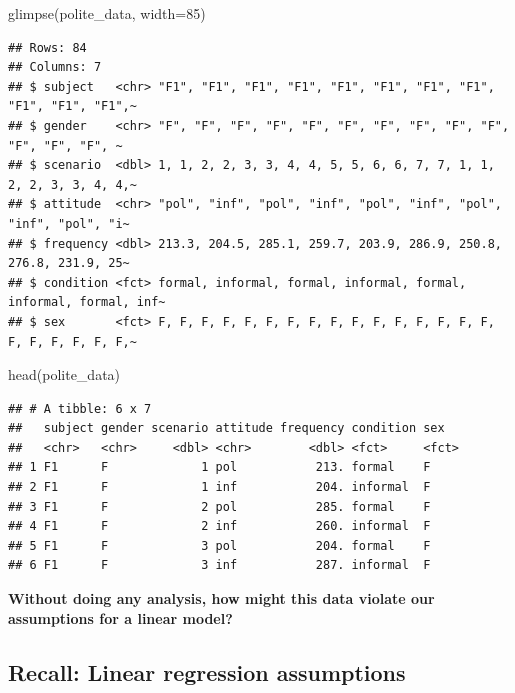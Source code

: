 \documentclass[
  openany]{book}
\newenvironment{Shaded}{\begin{snugshade}}{\end{snugshade}}
\newcommand{\AttributeTok}[1]{\textcolor[rgb]{0.77,0.63,0.00}{#1}}
\newcommand{\DecValTok}[1]{\textcolor[rgb]{0.00,0.00,0.81}{#1}}
\newcommand{\FunctionTok}[1]{\textcolor[rgb]{0.00,0.00,0.00}{#1}}
\newcommand{\NormalTok}[1]{#1}
\begin{document}
\begin{Shaded}
\begin{Highlighting}[]
\FunctionTok{glimpse}\NormalTok{(polite\_data, }\AttributeTok{width=}\DecValTok{85}\NormalTok{)}
\end{Highlighting}
\end{Shaded}

\begin{verbatim}
## Rows: 84
## Columns: 7
## $ subject   <chr> "F1", "F1", "F1", "F1", "F1", "F1", "F1", "F1", "F1", "F1", "F1",~
## $ gender    <chr> "F", "F", "F", "F", "F", "F", "F", "F", "F", "F", "F", "F", "F", ~
## $ scenario  <dbl> 1, 1, 2, 2, 3, 3, 4, 4, 5, 5, 6, 6, 7, 7, 1, 1, 2, 2, 3, 3, 4, 4,~
## $ attitude  <chr> "pol", "inf", "pol", "inf", "pol", "inf", "pol", "inf", "pol", "i~
## $ frequency <dbl> 213.3, 204.5, 285.1, 259.7, 203.9, 286.9, 250.8, 276.8, 231.9, 25~
## $ condition <fct> formal, informal, formal, informal, formal, informal, formal, inf~
## $ sex       <fct> F, F, F, F, F, F, F, F, F, F, F, F, F, F, F, F, F, F, F, F, F, F,~
\end{verbatim}

\begin{Shaded}
\begin{Highlighting}[]
\FunctionTok{head}\NormalTok{(polite\_data)}
\end{Highlighting}
\end{Shaded}

\begin{verbatim}
## # A tibble: 6 x 7
##   subject gender scenario attitude frequency condition sex  
##   <chr>   <chr>     <dbl> <chr>        <dbl> <fct>     <fct>
## 1 F1      F             1 pol           213. formal    F    
## 2 F1      F             1 inf           204. informal  F    
## 3 F1      F             2 pol           285. formal    F    
## 4 F1      F             2 inf           260. informal  F    
## 5 F1      F             3 pol           204. formal    F    
## 6 F1      F             3 inf           287. informal  F
\end{verbatim}

\textbf{Without doing any analysis, how might this data violate our assumptions for a linear model?}

\hypertarget{recall-linear-regression-assumptions}{%
\subsection{Recall: Linear regression assumptions}\label{recall-linear-regression-assumptions}}
\end{document}
